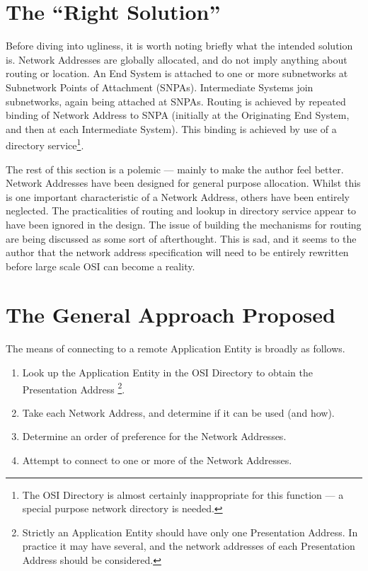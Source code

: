 \section {The ``Right Solution''}

Before diving into ugliness, it is worth noting briefly what the
intended solution is.  Network Addresses are globally allocated, and
do not imply anything about routing or location.  An End System is
attached to one or more subnetworks at Subnetwork Points of
Attachment (SNPAs).  Intermediate Systems join subnetworks, again
being attached at SNPAs.  Routing is achieved by repeated binding of
Network Address to SNPA (initially at the Originating End System,
and then at each Intermediate System).  This binding is achieved by
use of a directory service\footnote{The OSI Directory is almost
certainly inappropriate for this function --- a special purpose
network directory is needed.}. 

The rest of this section is a polemic --- mainly to make the author
feel better.  Network Addresses have been designed for general
purpose allocation.  Whilst this is one important characteristic of
a Network Address, others have been entirely neglected.  The
practicalities of routing and lookup in directory service appear to
have been ignored in the design.  The issue of building the
mechanisms for routing are being discussed as some sort of
afterthought.  This is sad, and it seems to the author that the
network address specification will need to be entirely rewritten
before large scale OSI can become a reality.  

\section {The General Approach Proposed}

The means of connecting to a remote Application Entity is broadly as
follows.  

\begin {enumerate}
\item Look up the Application Entity in the OSI Directory to obtain
the Presentation Address \footnote{Strictly an Application Entity
should have only one Presentation Address.  In practice it may have
several, and the network addresses of each Presentation Address
should be considered.}.

\item Take each Network Address, and determine if it can be used
(and how).

\item Determine an order of preference for the Network Addresses.

\item Attempt to connect to one or more of the Network Addresses.
\end {enumerate}

